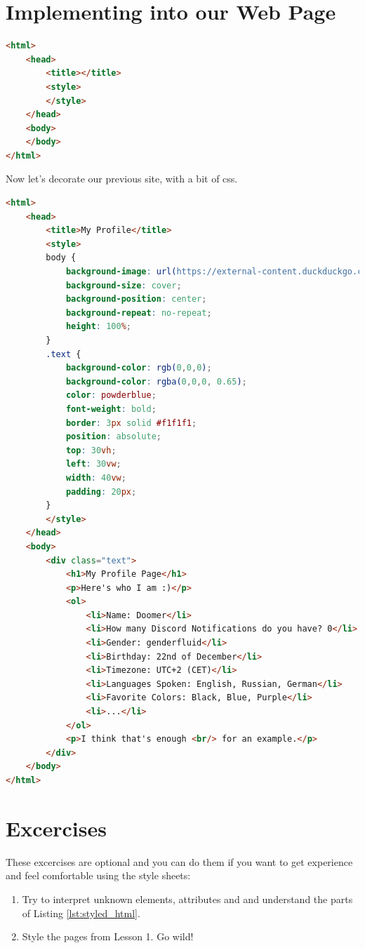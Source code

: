 \documentclass[a4paper,12pt]{article}
\begin{document}
\section{Implementing into our Web Page}
\begin{lstlisting}[language=HTML,caption=Updated Wireframe,label={lst:html_wireframe}]
<html>
    <head>
        <title></title>
        <style>
        </style>
    </head>
    <body>
    </body>
</html>
\end{lstlisting}
\newpage
Now let's decorate our previous site, with a bit of css.
\begin{lstlisting}[language=HTML,caption=Content Update,label={lst:styled_html}]
<html>
    <head>
        <title>My Profile</title>
        <style>
        body {
            background-image: url(https://external-content.duckduckgo.com/iu/?u=http%3A%2F%2Fwallsdesk.com%2Fwp-content%2Fuploads%2F2016%2F05%2FSakura-images.jpg&f=1&nofb=1);
            background-size: cover;
            background-position: center;
            background-repeat: no-repeat;
            height: 100%; 
        }
        .text {
	        background-color: rgb(0,0,0);
	        background-color: rgba(0,0,0, 0.65);
	        color: powderblue;
	        font-weight: bold;
	        border: 3px solid #f1f1f1;
	        position: absolute;
	        top: 30vh;
	        left: 30vw;
	        width: 40vw;
	        padding: 20px;
        }
        </style>
    </head>
    <body>
        <div class="text">
            <h1>My Profile Page</h1>
            <p>Here's who I am :)</p>
            <ol>
            	<li>Name: Doomer</li>
            	<li>How many Discord Notifications do you have? 0</li>
            	<li>Gender: genderfluid</li>
            	<li>Birthday: 22nd of December</li>
            	<li>Timezone: UTC+2 (CET)</li>
            	<li>Languages Spoken: English, Russian, German</li>
            	<li>Favorite Colors: Black, Blue, Purple</li>
            	<li>...</li>
            </ol>
            <p>I think that's enough <br/> for an example.</p>
        </div>
    </body>
</html>
\end{lstlisting}

\newpage
\section{Excercises}
These excercises are optional and you can do them if you want to get experience and feel comfortable using the style sheets:
\begin{enumerate}
    \item Try to interpret unknown elements, attributes and and understand the parts of Listing \ref{lst:styled_html}.
    \item Style the pages from Lesson 1. Go wild!
\end{enumerate}
\end{document}
